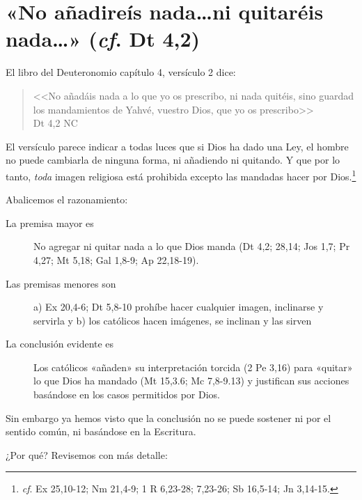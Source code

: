 \documentclass{article}
\begin{document}
\section{«No añadireís nada\ldots ni quitaréis nada\ldots» (\emph{cf}. Dt 4,2)}

El libro del Deuteronomio capítulo 4, versículo 2 dice:

\begin{quote}
<<No a\~nad\'ais nada a lo que yo os prescribo, ni nada quit\'eis, sino guardad los mandamientos de Yahv\'e, vuestro Dios, que yo os prescribo>>\\
Dt 4,2 NC
\end{quote}

\noindent
El versículo parece indicar a todas luces que si Dios ha dado una Ley, el hombre no puede cambiarla de ninguna forma, ni añadiendo ni quitando. Y que por lo tanto, \emph{toda} imagen religiosa está prohibida excepto las mandadas hacer por Dios.\footnote{\emph{cf}. Ex 25,10-12; Nm 21,4-9; 1 R 6,23-28; 7,23-26; Sb 16,5-14; Jn 3,14-15.}

Abalicemos el razonamiento:

\begin{description}
\item[La premisa mayor es] No agregar ni quitar nada a lo que Dios manda (Dt 4,2; 28,14; Jos 1,7; Pr 4,27; Mt 5,18; Gal 1,8-9; Ap 22,18-19).
\item[Las premisas menores son] a) Ex 20,4-6; Dt 5,8-10 prohíbe hacer cualquier imagen, inclinarse y servirla y b) los católicos hacen imágenes, se inclinan y las sirven
\item[La conclusión evidente es] Los católicos «añaden» su interpretación torcida (2 Pe 3,16) para «quitar» lo que Dios ha mandado (Mt 15,3.6; Mc 7,8-9.13) y justifican sus acciones basándose en los casos permitidos por Dios.
\end{description}

\noindent
Sin embargo ya hemos visto que la conclusión no se puede sostener ni por el sentido común, ni basándose en la Escritura.

¿Por qué? Revisemos con más detalle:
\end{document}
